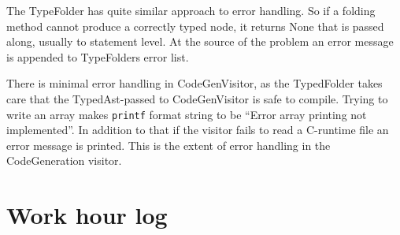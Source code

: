 \documentclass[12pt,a4paper]{article}
\begin{document}
The TypeFolder has quite similar approach to error handling. So if a folding
method cannot produce a correctly typed node, it returns None that is passed along,
usually to statement level. At the source of the problem an error message is
appended to TypeFolders error list.

There is minimal error handling in CodeGenVisitor, as the TypedFolder takes
care that the TypedAst-passed to CodeGenVisitor is safe to compile.  Trying to
write an array makes \texttt{printf} format string to be ``Error array printing
not implemented''. In addition to that if the visitor fails to read a C-runtime
file an error message is printed. This is the extent of error handling in the
CodeGeneration visitor.

\section{Work hour log}
\end{document}
